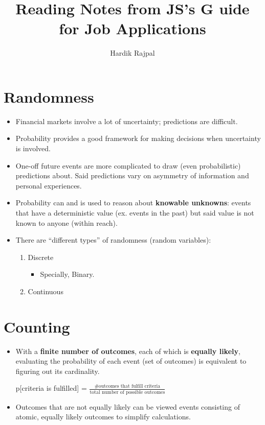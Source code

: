 \documentclass{article}
\title{Reading Notes from JS's G
uide for Job Applications}
\author{Hardik Rajpal}
\begin{document}
\maketitle
\section{Randomness}
\begin{itemize}
\item Financial markets involve a lot of uncertainty; predictions are difficult.
\item Probability provides a good framework for making decisions when uncertainty is involved.
\item One-off future events are more complicated to draw (even probabilistic) predictions about. Said predictions vary on asymmetry of information and personal experiences.
\item Probability can and is used to reason about \textbf{knowable unknowns}: events that have a deterministic value (ex. events in the past) but said value is not known to anyone (within reach). 
\item There are ``different types'' of randomness (random variables):
\begin{enumerate}
    \item Discrete
    \begin{itemize}
        \item Specially, Binary.
    \end{itemize}
    \item Continuous
\end{enumerate} 
\end{itemize}
\section{Counting}
\begin{itemize}
\item With a \textbf{finite number of outcomes}, each of which is \textbf{equally likely}, evaluating the probability of each event (set of outcomes) is equivalent to figuring out its cardinality.
\begin{center}
    p[criteria is fulfilled] = $\frac{\text{\# outcomes that fulfill criteria}}{\text{total number of possible outcomes}}$
\end{center}
\item Outcomes that are not equally likely can be viewed events consisting of atomic, equally likely outcomes to simplify calculations. 
\end{itemize}
\end{document}
